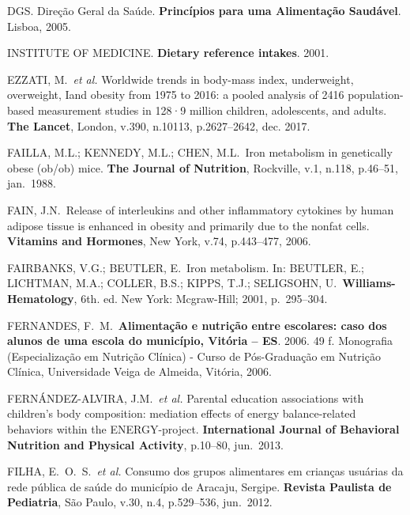 \noindent DGS. Direção Geral da Saúde. \textbf{Princípios para uma Alimentação Saudável}. Lisboa, 2005.

\bigbreak

\noindent INSTITUTE OF MEDICINE. \textbf{Dietary reference intakes}. 2001.

\bigbreak

\noindent EZZATI, M.\ \textit{et al.} Worldwide trends in body-mass index, underweight, overweight, Iand obesity from 1975 to 2016: a pooled analysis of 2416 population-based measurement studies in 128·9 million children, adolescents, and adults. \textbf{The Lancet}, London, v.390, n.10113, p.2627--2642, dec. 2017. 

\bigbreak

\noindent FAILLA, M.L.; KENNEDY, M.L.; CHEN, M.L.\ Iron metabolism in genetically obese (ob/ob) mice. \textbf{The Journal of Nutrition}, Rockville, v.1, n.118, p.46–51, jan.\ 1988. 

\bigbreak

\noindent FAIN, J.N.\ Release of interleukins and other inflammatory cytokines by human adipose tissue is enhanced in obesity and primarily due to the nonfat cells. \textbf{Vitamins and Hormones}, New York, v.74, p.443--477, 2006.

\bigbreak

\noindent FAIRBANKS, V.G.; BEUTLER, E.\ Iron metabolism. In: BEUTLER, E.; LICHTMAN, M.A.; COLLER, B.S.; KIPPS, T.J.; SELIGSOHN, U.\ \textbf{Williams-Hematology}, 6th. ed. New York: Mcgraw-Hill; 2001, p.\ 295--304.  

\bigbreak

\noindent FERNANDES, F.\ M.\ \textbf{Alimentação e nutrição entre escolares: caso dos alunos de uma escola do município, Vitória – ES}. 2006. 49 f. Monografia (Especialização em Nutrição Clínica) - Curso de Pós-Graduação em Nutrição Clínica, Universidade Veiga de Almeida, Vitória, 2006.

\bigbreak

\noindent FERNÁNDEZ-ALVIRA, J.M.\ \textit{et al.} Parental education associations with children’s body composition: mediation effects of energy balance-related behaviors within the ENERGY-project. \textbf{International Journal of Behavioral Nutrition and Physical Activity}, p.10--80, jun.\ 2013. 

\bigbreak

\noindent FILHA, E.\ O.\ S.\ \textit{et al.} Consumo dos grupos alimentares em crianças usuárias da rede pública de saúde do município de Aracaju, Sergipe. \textbf{Revista Paulista de Pediatria}, São Paulo, v.30, n.4, p.529--536, jun.\ 2012.

